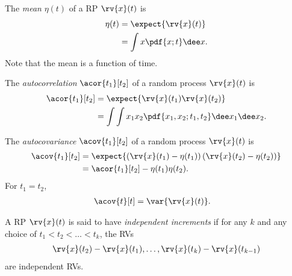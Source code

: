 \begin{mydefinition}
    The \emph{mean} $\eta(t)$ of a RP $\rv{x}(t)$ is 
    \begin{align}
        \eta(t) &= \expect{\rv{x}(t)}\\
        &= \int x\pdf{x; t}\dee x.
    \end{align}
    Note that the mean is a function of time.
\end{mydefinition}

\begin{mydefinition}[Autocorrelation]
    The \emph{autocorrelation} $\acor{t_{1}}[t_{2}]$ of a random process $\rv{x}(t)$ is
    \begin{align}
        \acor{t_{1}}[t_{2}] &= \expect{\rv{x}(t_{1})\rv{x}(t_{2})}\\
        &= \int\int x_{1}x_{2}\pdf{x_{1}, x_{2}; t_{1}, t_{2}}\dee x_{1} \dee x_{2}.
    \end{align}
\end{mydefinition}
\begin{mydefinition}[Autocovariance]
    The \emph{autocovariance} $\acov{t_{1}}[t_{2}]$ of a random process $\rv{x}(t)$ is
    \begin{align}
        \acov{t_{1}}[t_{2}] &= \expect{\left(\rv{x}(t_{1}) - \eta(t_{1})\right)\left(\rv{x}(t_{2}) - \eta(t_{2})\right)}\\
        &= \acor{t_{1}}[t_{2}] - \eta(t_{1})\eta(t_{2}).        
    \end{align}
    For $t_{1} = t_{2}$, 
    \begin{align}
        \acov{t}[t] &= \var{\rv{x}(t)}.
    \end{align}
\end{mydefinition}

\begin{mydefinition}
    A RP $\rv{x}(t)$ is said to have \emph{independent increments} if for any $k$ and any choice of $t_{1} < t_{2} < \ldots < t_{k}$, the RVs 
    \begin{align}
        \rv{x}(t_{2}) - \rv{x}(t_{1}), \ldots, \rv{x}(t_{k}) - \rv{x}(t_{k-1})
    \end{align}
    are independent RVs.
\end{mydefinition}

